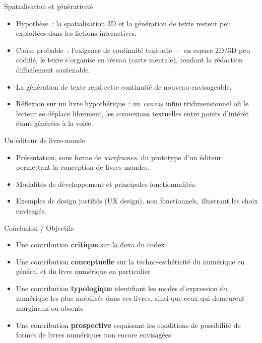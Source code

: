\documentclass[xcolor=monochrome,11pt]{beamer}
\begin{document}
\begin{frame}{Spatialisation et générativité}
  \footnotesize
  \begin{itemize}
    \item Hypothèse~: la spatialisation 3D et la génération de texte
      restent peu exploitées dans les fictions interactives.
    \item Cause probable~: l'exigence de continuité textuelle --- en
      espace 2D/3D peu codifié, le texte s'organise en réseau (carte
      mentale), rendant la rédaction difficilement soutenable.
    \item La génération de texte rend cette continuité de nouveau
      envisageable.
    \item Réflexion sur un livre hypothétique~: un \emph{canvas} infini
      tridimensionnel où le lecteur se déplace librement, les connexions
      textuelles entre points d'intérêt étant générées à la volée.
  \end{itemize}
\end{frame}

\begin{frame}{Un éditeur de livre-monde}
  \footnotesize
  \begin{itemize}
    \item Présentation, sous forme de \emph{wireframes}, du prototype
      d'un éditeur permettant la conception de livres-mondes.
    \item Modalités de développement et principales fonctionnalités.
    \item Exemples de design justifiés (UX design), non fonctionnels,
      illustrant les choix envisagés.
  \end{itemize}
\end{frame}

\begin{frame}{Conclusion / Objectifs}
  \begin{itemize}
    \item Une contribution \textbf{critique} sur la doxa du codex
    \item Une contribution \textbf{conceptuelle} sur la
      techno-esthéticité du numérique en général et du livre numérique en
      particulier
    \item Une contribution \textbf{typologique} identifiant les modes
      d'expression du numérique les plus mobilisés dans ces livres, ainsi
      que ceux qui demeurent marginaux ou absents
    \item Une contribution \textbf{prospective} esquissant les conditions
      de possibilité de formes de livres numériques non encore envisagées
  \end{itemize}
\end{frame}
\end{document}
